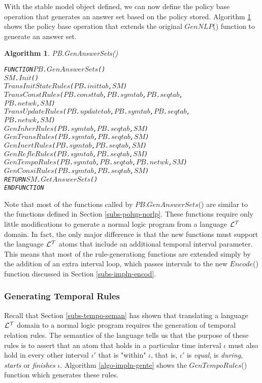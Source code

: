 \documentclass[11pt]{report}
\newenvironment{vverbatim}
{
  \begin{alltt}
}
{
    \vspace{-\baselineskip}
  \end{alltt}
}
\newtheorem{vvalgorithm}{Algorithm}[chapter]
\newenvironment{valgorithm}[2]
{
  \begin{vvalgorithm}{#1}
    \label{#2}
    \small
    \begin{vverbatim}
}
{
    \end{vverbatim}
  \end{vvalgorithm}
}
\begin{document}
        With the stable model object defined, we can now define the policy
        base operation that generates an answer set based on the policy
        stored. Algorithm \ref{algo-impln-genas} shows the policy base
        operation that extends the original $GenNLP$() function to
        generate an answer set.

        \begin{valgorithm}{PB.GenAnswerSets()}{algo-impln-genas}
FUNCTION \(PB\).\(GenAnswerSets\)()
  \(SM\).\(Init\)()
  \(TransInitStateRules\)(\(PB\).\(inittab\), \(SM\))
  \(TransConstRules\)(\(PB\).\(consttab\), \(PB\).\(symtab\), \(PB\).\(seqtab\),
    \(PB\).\(netwk\), \(SM\))
  \(TransUpdateRules\)(\(PB\).\(updatetab\), \(PB\).\(symtab\), \(PB\).\(seqtab\),
    \(PB\).\(netwk\), \(SM\))
  \(GenInherRules\)(\(PB\).\(symtab\), \(PB\).\(seqtab\), \(SM\))
  \(GenTransRules\)(\(PB\).\(symtab\), \(PB\).\(seqtab\), \(SM\))
  \(GenInertRules\)(\(PB\).\(symtab\), \(PB\).\(seqtab\), \(SM\))
  \(GenRefleRules\)(\(PB\).\(symtab\), \(PB\).\(seqtab\), \(SM\))
  \(GenTempoRules\)(\(PB\).\(symtab\), \(PB\).\(seqtab\), \(PB\).\(netwk\), \(SM\))
  \(GenConsiRules\)(\(PB\).\(symtab\), \(PB\).\(seqtab\), \(SM\))
  RETURN \(SM\).\(GetAnswerSets\)()
ENDFUNCTION
        \end{valgorithm}

        Note that most of the functions called by \(PB\).\(GenAnswerSets\)()
        are similar to the functions defined in Section
        \ref{subs-polup-norlp}. These functions require only little
        modifications to generate a normal logic program from a language
        ${\cal L^T}$ domain. In fact, the only major difference is
        that the new functions must support the language ${\cal L^T}$ atoms
        that include an additional temporal interval parameter. This means
        that most of the rule-generationg functions are extended simply by
        the addition of an extra interval loop, which passes intervals to the
        new $Encode$() function discussed in Section \ref{subs-impln-encod}.

        \subsubsection{Generating Temporal Rules}

          Recall that Section \ref{subs-tempo-seman} has shown that translating
          a language ${\cal L^T}$ domain to a normal logic program requires the
          generation of temporal relation rules. The semantics of the language
          tells us that the purpose of these rules is to assert that an atom
          that holds in a particular time interval $\iota$ must also hold in
          every other interval $\iota'$ that is "within" $\iota$, that is,
          $\iota'$ is {\em equal}, is {\em during}, {\em starts} or
          {\em finishes} $\iota$. Algorithm \ref{algo-impln-gente} shows the
          $GenTempoRules$() function which generates these rules.
\end{document}
